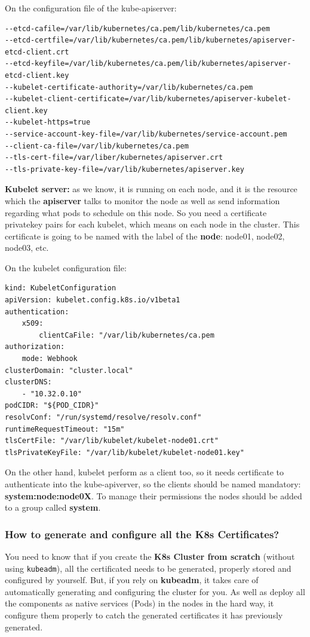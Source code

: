 \documentclass{article}
\newenvironment{codetemplate}[1][]{%
  \mybasecolorbox[#1]
  \itshape
}{%
  \endmybasecolorbox
}
\begin{document}
On the configuration file of the kube-apiserver:
\begin{codetemplate}{}
\begin{verbatim}
--etcd-cafile=/var/lib/kubernetes/ca.pem/lib/kubernetes/ca.pem
--etcd-certfile=/var/lib/kubernetes/ca.pem/lib/kubernetes/apiserver-etcd-client.crt
--etcd-keyfile=/var/lib/kubernetes/ca.pem/lib/kubernetes/apiserver-etcd-client.key
--kubelet-certificate-authority=/var/lib/kubernetes/ca.pem
--kubelet-client-certificate=/var/lib/kubernetes/apiserver-kubelet-client.key
--kubelet-https=true
--service-account-key-file=/var/lib/kubernetes/service-account.pem
--client-ca-file=/var/lib/kubernetes/ca.pem
--tls-cert-file=/var/liber/kubernetes/apiserver.crt
--tls-private-key-file=/var/lib/kubernetes/apiserver.key
\end{verbatim}
\end{codetemplate}

\textbf{Kubelet server:} as we know, it is running on each node, and it is the resource which the \textbf{apiserver}
talks to monitor the node as well as send information regarding what pods to schedule on this node. So you need a certificate privatekey pairs for each kubelet,
which means on each node in the cluster. This certificate is going to be named with the label of the \textbf{node}: node01, node02, node03, etc.

On the kubelet configuration file:
\begin{codetemplate}{}
\begin{verbatim}
kind: KubeletConfiguration
apiVersion: kubelet.config.k8s.io/v1beta1
authentication:
    x509:
        clientCaFile: "/var/lib/kubernetes/ca.pem
authorization:
    mode: Webhook
clusterDomain: "cluster.local"
clusterDNS:
    - "10.32.0.10"
podCIDR: "${POD_CIDR}"
resolvConf: "/run/systemd/resolve/resolv.conf"
runtimeRequestTimeout: "15m"
tlsCertFile: "/var/lib/kubelet/kubelet-node01.crt"
tlsPrivateKeyFile: "/var/lib/kubelet/kubelet-node01.key"
\end{verbatim}
\end{codetemplate}

On the other hand, kubelet perform as a client too, so it needs certificate to authenticate into the kube-apiverver, so the clients should be named mandatory: \textbf{system:node:node0X}. To manage their permissions the nodes should be added to a group called \textbf{system}.

\subsubsection{How to generate and configure all the K8s Certificates?}
You need to know that if you create the \textbf{K8s Cluster from scratch} (without using \verb|kubeadm|), all the certificated needs to be generated, properly stored and configured by yourself.
But, if you rely on \textbf{kubeadm}, it takes care of automatically generating and configuring the cluster for you.
As well as deploy all the components as native services (Pods) in the nodes in the hard way, it configure them properly to catch the generated certificates it has previously generated.
\end{document}
